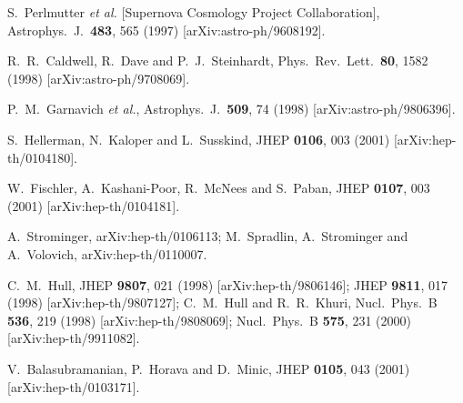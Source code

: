 \documentclass[a4paper,12pt]{article}
\begin{document}
\begin{thebibliography}{99}
S.~Perlmutter {\it et al.}  [Supernova Cosmology Project Collaboration],
Astrophys.\ J.\  {\bf 483}, 565 (1997)
[arXiv:astro-ph/9608192].
 
R.~R.~Caldwell, R.~Dave and P.~J.~Steinhardt,
Phys.\ Rev.\ Lett.\  {\bf 80}, 1582 (1998)
[arXiv:astro-ph/9708069].
 
P.~M.~Garnavich {\it et al.},
Astrophys.\ J.\  {\bf 509}, 74 (1998)
[arXiv:astro-ph/9806396].

S.~Hellerman, N.~Kaloper and L.~Susskind,
JHEP {\bf 0106}, 003 (2001)
[arXiv:hep-th/0104180].
 
W.~Fischler, A.~Kashani-Poor, R.~McNees and S.~Paban,
JHEP {\bf 0107}, 003 (2001)
[arXiv:hep-th/0104181].

A.~Strominger,
arXiv:hep-th/0106113;
M.~Spradlin, A.~Strominger and A.~Volovich,
arXiv:hep-th/0110007.

C.~M.~Hull,
JHEP {\bf 9807}, 021 (1998)
[arXiv:hep-th/9806146];
JHEP {\bf 9811}, 017 (1998)
[arXiv:hep-th/9807127]; 
C.~M.~Hull and R.~R.~Khuri,
Nucl.\ Phys.\ B {\bf 536}, 219 (1998)
[arXiv:hep-th/9808069];
Nucl.\ Phys.\ B {\bf 575}, 231 (2000)
[arXiv:hep-th/9911082].
 

V.~Balasubramanian, P.~Horava and D.~Minic,
JHEP {\bf 0105}, 043 (2001)
[arXiv:hep-th/0103171].


\end{thebibliography}
\end{document}

